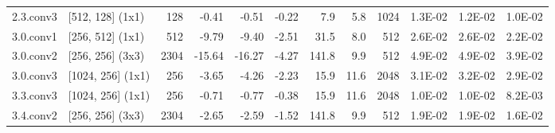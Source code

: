 \begin{table}
\begin{tabular}{llrrrrrrrrrr}
2.3.conv3 & [512, 128] (1x1) & 128 & {\cellcolor[HTML]{ECF7A6}} \color[HTML]{000000} -0.41 & {\cellcolor[HTML]{EEF8A8}} \color[HTML]{000000} -0.51 & {\cellcolor[HTML]{EBF7A3}} \color[HTML]{000000} -0.22 & 7.9 & 5.8 & 1024 & {\cellcolor[HTML]{CFEB85}} \color[HTML]{000000} 1.3E-02 & {\cellcolor[HTML]{CDEA83}} \color[HTML]{000000} 1.2E-02 & {\cellcolor[HTML]{C1E57B}} \color[HTML]{000000} 1.0E-02 \\
3.0.conv1 & [256, 512] (1x1) & 512 & {\cellcolor[HTML]{FCAA5F}} \color[HTML]{000000} -9.79 & {\cellcolor[HTML]{FDB163}} \color[HTML]{000000} -9.40 & {\cellcolor[HTML]{FFFCBA}} \color[HTML]{000000} -2.51 & 31.5 & 8.0 & 512 & {\cellcolor[HTML]{FFF5AE}} \color[HTML]{000000} 2.6E-02 & {\cellcolor[HTML]{FFF7B2}} \color[HTML]{000000} 2.6E-02 & {\cellcolor[HTML]{F7FCB4}} \color[HTML]{000000} 2.2E-02 \\
3.0.conv2 & [256, 256] (3x3) & 2304 & {\cellcolor[HTML]{E24731}} \color[HTML]{F1F1F1} -15.64 & {\cellcolor[HTML]{DD3D2D}} \color[HTML]{F1F1F1} -16.27 & {\cellcolor[HTML]{FEEDA1}} \color[HTML]{000000} -4.27 & 141.8 & 9.9 & 512 & {\cellcolor[HTML]{F67A49}} \color[HTML]{F1F1F1} 4.9E-02 & {\cellcolor[HTML]{F67A49}} \color[HTML]{F1F1F1} 4.9E-02 & {\cellcolor[HTML]{FDBF6F}} \color[HTML]{000000} 3.9E-02 \\
3.0.conv3 & [1024, 256] (1x1) & 256 & {\cellcolor[HTML]{FFF2AA}} \color[HTML]{000000} -3.65 & {\cellcolor[HTML]{FEEDA1}} \color[HTML]{000000} -4.26 & {\cellcolor[HTML]{FFFEBE}} \color[HTML]{000000} -2.23 & 15.9 & 11.6 & 2048 & {\cellcolor[HTML]{FEE491}} \color[HTML]{000000} 3.1E-02 & {\cellcolor[HTML]{FEE08B}} \color[HTML]{000000} 3.2E-02 & {\cellcolor[HTML]{FEEC9F}} \color[HTML]{000000} 2.9E-02 \\
3.3.conv3 & [1024, 256] (1x1) & 256 & {\cellcolor[HTML]{F1F9AC}} \color[HTML]{000000} -0.71 & {\cellcolor[HTML]{F1F9AC}} \color[HTML]{000000} -0.77 & {\cellcolor[HTML]{ECF7A6}} \color[HTML]{000000} -0.38 & 15.9 & 11.6 & 2048 & {\cellcolor[HTML]{C1E57B}} \color[HTML]{000000} 1.0E-02 & {\cellcolor[HTML]{C3E67D}} \color[HTML]{000000} 1.0E-02 & {\cellcolor[HTML]{B7E075}} \color[HTML]{000000} 8.2E-03 \\
3.4.conv2 & [256, 256] (3x3) & 2304 & {\cellcolor[HTML]{FFFBB8}} \color[HTML]{000000} -2.65 & {\cellcolor[HTML]{FFFCBA}} \color[HTML]{000000} -2.59 & {\cellcolor[HTML]{F8FCB6}} \color[HTML]{000000} -1.52 & 141.8 & 9.9 & 512 & {\cellcolor[HTML]{EEF8A8}} \color[HTML]{000000} 1.9E-02 & {\cellcolor[HTML]{EEF8A8}} \color[HTML]{000000} 1.9E-02 & {\cellcolor[HTML]{E2F397}} \color[HTML]{000000} 1.6E-02 \\

\end{tabular}
\end{table}
